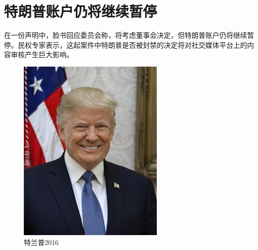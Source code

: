 \documentclass[a4paper,11pt]{ctexart}
\begin{document}
	\section{特朗普账户仍将继续暂停}
	在一份声明中，脸书回应委员会称，将考虑董事会决定，但特朗普账户仍将继续暂停。民权专家表示，这起案件中特朗普是否被封禁的决定将对社交媒体平台上的内容审核产生巨大影响\cite{adams1995hitchhiker,王征2017基于卷积神经网络和}。
	\begin{figure}[H]
		\centering
		\includegraphics[scale=0.5]{tlp}
		\caption{特兰普2016}
		\label{fig:tlp2016}
	\end{figure}
	
\end{document}

